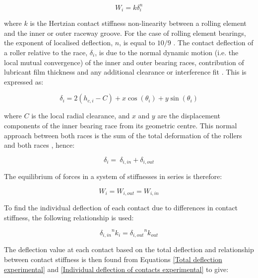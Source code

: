\begin{equation}\label{Hertz load deflection}
	W_i=k \delta_i^n
\end{equation}

where $k$ is the Hertzian contact stiffness non-linearity between a rolling element and the inner or outer raceway groove. For the case of rolling element bearings, the exponent of localised deflection, $n$, is equal to $10/9$ \cite{Harris1984}. The contact deflection of a roller relative to the race, $\delta_i$, is due to the normal dynamic motion (i.e. the local mutual convergence) of the inner and outer bearing races, contribution of lubricant film thickness and any additional clearance or interference fit \cite{Mohammadpour2015c}. This is expressed as:

\begin{equation}\label{Contact deflection experimental}
	\delta_i=2\left(h_{c,i}-C\right)+x\cos{\left(\theta_i\right)}+y\sin(\theta_i)
\end{equation}

where $C$ is the local radial clearance, and $x$ and $y$ are the displacement components of the inner bearing race from its geometric centre. This normal approach between both races is the sum of the total deformation of the rollers and both races \cite{Hamrock1981}, hence:

\begin{equation}\label{Total deflection experimental}
\delta_i=\ \delta_{i,in}+\delta_{i,out}
\end{equation}

The equilibrium of forces in a system of stiffnesses in series is therefore:

\begin{equation}\label{Equilibrium of force experimental}
W_i=W_{i,out}=W_{i,in}
\end{equation}

To find the individual deflection of each contact due to differences in contact stiffness, the following relationship is used:

\begin{equation}\label{Individual deflection of contacts experimental}
{\delta_{i,in}}^nk_i={\delta_{i,out}}^nk_{out}
\end{equation}

The deflection value at each contact based on the total deflection and relationship between contact stiffness is then found from Equations \ref{Total deflection experimental} and \ref{Individual deflection of contacts experimental} to give:

